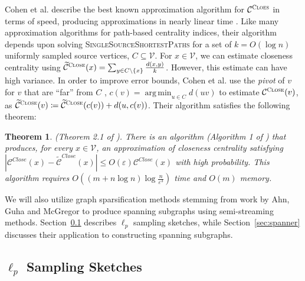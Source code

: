 \documentclass{report}
\newtheorem{theorem}{Theorem}[section]
\DeclareMathOperator*{\argmin}{arg\,min}
\newcommand{\algoname}[1]{\textnormal{\textsc{#1}}}
\begin{document}
Cohen et al. describe the best known approximation algorithm for $\mathcal{C}^{\algoname{Cloes}}$ in terms of speed, producing approximations in  nearly linear time \cite{cohen2014computing}. 
Like many approximation algorithms for path-based centrality indices, their algorithm depends upon solving \algoname{SingleSourceShortestPaths} for a set of $k = O(\log n)$ uniformly sampled source vertices, $C \subseteq \mathcal{V}$.
For $x \in \mathcal{V}$, we can estimate closeness centrality using $\widetilde{\mathcal{C}}^{\algoname{Close}}(x) = \sum_{y \in C \setminus \{x \}} \frac{d(x,y)}{k}$.
However, this estimate can have high variance.
In order to improve error bounds, Cohen et al. use the \emph{pivot} of $v$ for $v$ that are ``far'' from $C$ , $c(v) = \argmin_{u \in C} d(uv)$ to estimate $\mathcal{C}^{\algoname{Close}}(v)$, as $\widetilde{\mathcal{C}}^{\algoname{Close}}(v) \coloneqq \widetilde{\mathcal{C}}^{\algoname{Close}}(c(v)) + d(u, c(v))$. 
Their algorithm satisfies the following theorem:
%
\begin{theorem}{(Theorem 2.1 of \cite{cohen2014computing}).} \label{thm:cc:approx}
There is an algorithm (Algorithm 1 of \cite{cohen2014computing}) that produces, for every $x \in \mathcal{V}$, an approximation of closeness centrality satisfying $|\mathcal{C}^{Close}(x) - \widetilde{\mathcal{C}}^{Close}(x)| \leq O(\varepsilon) \mathcal{C}^{Close}(x)$ with high probability.
This algorithm requires $O((m + n \log n) \log \frac{n}{\varepsilon^{3}})$ time and $O(m)$ memory.
\end{theorem}


We will also utilize graph sparsification methods stemming from work by Ahn, Guha and McGregor to produce spanning subgraphs using semi-streaming methods.
Section~\ref{sec:lp-sample} describes $\ell_p$ sampling sketches, while Section~\ref{sec:spanner} discusses their application to constructing spanning subgraphs.


\subsection{$\ell_p$ Sampling Sketches} \label{sec:lp-sample}
\end{document}
